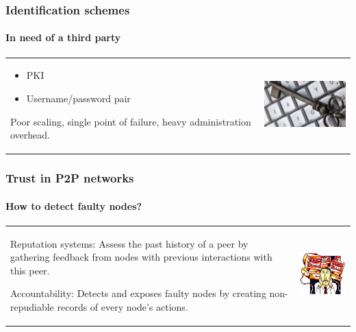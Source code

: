 \begin{frame}
\frametitle{Identification schemes}
\framesubtitle{In need of a third party}
\begin{table}
\begin{tabular}{p{7cm}p{3cm}}
\begin{itemize}
    \item PKI
    \item Username/password pair
\end{itemize}

Poor scaling, single point of failure, heavy administration overhead.
&
\vspace{1.5cm}
\includegraphics[width=4cm]{img/keyboard_key}\\
\end{tabular}
\end{table}
\end{frame}

\begin{frame}
\frametitle{Trust in P2P networks}
\framesubtitle{How to detect faulty nodes?}
\begin{table}
\begin{tabular}{p{7cm}p{3cm}}
\begin{description}
    \item{Reputation systems:} Assess the past history of a
peer by gathering feedback from nodes with previous interactions with this
peer.
    \item{Accountability:} Detects and exposes faulty nodes by
creating non-repudiable records of every node’s actions.
\end{description}
&
\vspace{1.5cm}
\includegraphics[width=4cm]{img/malicious}\\
\end{tabular}
\end{table}
\end{frame}

